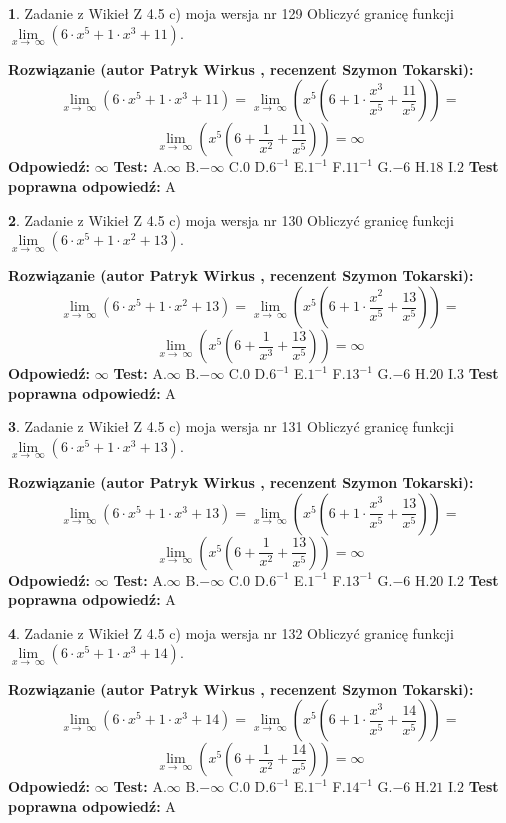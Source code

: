\documentclass[12pt, a4paper]{article}
\theoremstyle{definition} %
\newtheorem{zad}{}
\newcommand{\zadStart}[1]{\begin{zad}#1\newline}
\newcommand{\zadStop}{\end{zad}}
\newcommand{\rozwStart}[2]{\noindent \textbf{Rozwiązanie (autor #1 , recenzent #2): }\newline}
\newcommand{\rozwStop}{\newline}
\newcommand{\odpStart}{\noindent \textbf{Odpowiedź:}\newline}
\newcommand{\odpStop}{\newline}
\newcommand{\testStart}{\noindent \textbf{Test:}\newline}
\newcommand{\testStop}{\newline}
\newcommand{\kluczStart}{\noindent \textbf{Test poprawna odpowiedź:}\newline}
\newcommand{\kluczStop}{\newline}
\begin{document}
\zadStart{Zadanie z Wikieł Z 4.5 c) moja wersja nr 129}
Obliczyć granicę funkcji  $\lim\limits_{x\to\ \infty}(6 \cdot x^{5}+1 \cdot x^{3}+11)$.
\zadStop
\rozwStart{Patryk Wirkus}{Szymon Tokarski}
$$\lim\limits_{x\to\ \infty}(6 \cdot x^{5}+1 \cdot x^{3}+11) = \lim\limits_{x\to\ \infty}(x^{5}(6 +1 \cdot \frac{x^{3}}{x^{5}}+\frac{11}{x^{5}})) =$$ $$\lim\limits_{x\to\ \infty}(x^{5}(6 +\frac{1}{x^{2}}+\frac{11}{x^{5}})) =\infty$$
\rozwStop
\odpStart
$\infty$
\odpStop
\testStart
A.$\infty$ B.$-\infty$ C.$0$ D.$6^{-1}$ E.$1^{-1}$
F.$11^{-1}$ G.$-6$
H.$18$
I.$2$
\testStop
\kluczStart
A
\kluczStop



\zadStart{Zadanie z Wikieł Z 4.5 c) moja wersja nr 130}
Obliczyć granicę funkcji  $\lim\limits_{x\to\ \infty}(6 \cdot x^{5}+1 \cdot x^{2}+13)$.
\zadStop
\rozwStart{Patryk Wirkus}{Szymon Tokarski}
$$\lim\limits_{x\to\ \infty}(6 \cdot x^{5}+1 \cdot x^{2}+13) = \lim\limits_{x\to\ \infty}(x^{5}(6 +1 \cdot \frac{x^{2}}{x^{5}}+\frac{13}{x^{5}})) =$$ $$\lim\limits_{x\to\ \infty}(x^{5}(6 +\frac{1}{x^{3}}+\frac{13}{x^{5}})) =\infty$$
\rozwStop
\odpStart
$\infty$
\odpStop
\testStart
A.$\infty$ B.$-\infty$ C.$0$ D.$6^{-1}$ E.$1^{-1}$
F.$13^{-1}$ G.$-6$
H.$20$
I.$3$
\testStop
\kluczStart
A
\kluczStop



\zadStart{Zadanie z Wikieł Z 4.5 c) moja wersja nr 131}
Obliczyć granicę funkcji  $\lim\limits_{x\to\ \infty}(6 \cdot x^{5}+1 \cdot x^{3}+13)$.
\zadStop
\rozwStart{Patryk Wirkus}{Szymon Tokarski}
$$\lim\limits_{x\to\ \infty}(6 \cdot x^{5}+1 \cdot x^{3}+13) = \lim\limits_{x\to\ \infty}(x^{5}(6 +1 \cdot \frac{x^{3}}{x^{5}}+\frac{13}{x^{5}})) =$$ $$\lim\limits_{x\to\ \infty}(x^{5}(6 +\frac{1}{x^{2}}+\frac{13}{x^{5}})) =\infty$$
\rozwStop
\odpStart
$\infty$
\odpStop
\testStart
A.$\infty$ B.$-\infty$ C.$0$ D.$6^{-1}$ E.$1^{-1}$
F.$13^{-1}$ G.$-6$
H.$20$
I.$2$
\testStop
\kluczStart
A
\kluczStop



\zadStart{Zadanie z Wikieł Z 4.5 c) moja wersja nr 132}
Obliczyć granicę funkcji  $\lim\limits_{x\to\ \infty}(6 \cdot x^{5}+1 \cdot x^{3}+14)$.
\zadStop
\rozwStart{Patryk Wirkus}{Szymon Tokarski}
$$\lim\limits_{x\to\ \infty}(6 \cdot x^{5}+1 \cdot x^{3}+14) = \lim\limits_{x\to\ \infty}(x^{5}(6 +1 \cdot \frac{x^{3}}{x^{5}}+\frac{14}{x^{5}})) =$$ $$\lim\limits_{x\to\ \infty}(x^{5}(6 +\frac{1}{x^{2}}+\frac{14}{x^{5}})) =\infty$$
\rozwStop
\odpStart
$\infty$
\odpStop
\testStart
A.$\infty$ B.$-\infty$ C.$0$ D.$6^{-1}$ E.$1^{-1}$
F.$14^{-1}$ G.$-6$
H.$21$
I.$2$
\testStop
\kluczStart
A
\kluczStop
\end{document}
